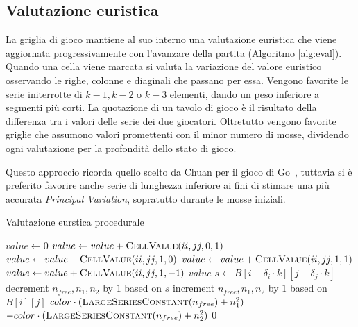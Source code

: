 \documentclass{article}
\begin{document}
\subsection*{Valutazione euristica}

La griglia di gioco mantiene al suo interno una valutazione euristica che viene
aggiornata progressivamente con l'avanzare della partita (Algoritmo \vref{alg:eval}).
Quando una cella viene marcata si valuta la variazione del valore euristico osservando
le righe, colonne e diaginali che passano per essa. Vengono favorite le serie initerrotte
di $k-1, k-2$ o $k-3$ elementi, dando un peso inferiore a segmenti pi\`u corti.
La quotazione di un tavolo di gioco \`e il risultato della differenza tra i
valori delle serie dei due giocatori. Oltretutto vengono favorite griglie che
assumono valori promettenti con il minor numero di mosse, dividendo ogni
valutazione per la profondit\`a dello stato di gioco.

Questo approccio ricorda quello scelto da Chuan per il gioco di Go~\cite{chuan},
tuttavia si \`e preferito favorire anche serie di lunghezza inferiore ai fini di
stimare una pi\`u accurata \emph{Principal Variation}, sopratutto durante le
mosse iniziali.

\begin{algorithm}[H]
  \caption{Valutazione eurstica procedurale}
  \label{alg:eval}
  \begin{algorithmic}[0]
      \State $value \gets 0$
        \State $value \gets value + \Call{CellValue}{ii, jj, 0, 1}$
      \EndFor
        \State $value \gets value + \Call{CellValue}{ii, jj, 1, 0}$
      \EndFor
        \State $value \gets value + \Call{CellValue}{ii, jj, 1, 1}$
      \EndFor
        \State $value \gets value + \Call{CellValue}{ii, jj, 1, -1}$
      \EndFor
      \State \Return $value$
    \EndProcedure
    \Statex
       
        \State $s \gets B[i - \delta_i \cdot k][j - \delta_j \cdot k]$ 
        \State decrement $n_{free}, n_1, n_2$ by $1$ based on $s$
      \EndIf
      \State increment $n_{free}, n_1, n_2$ by $1$ based on $B[i][j]$
      \Statex
        \State \Return $color \cdot (\Call{LargeSeriesConstant}{n_{free}} + n_1^2)$
        \State \Return $-color \cdot (\Call{LargeSeriesConstant}{n_{free}} + n_2^2)$
      \Else
        \State \Return $0$
      \EndIf
    \EndProcedure
  \end{algorithmic}
\end{algorithm}
\end{document}
